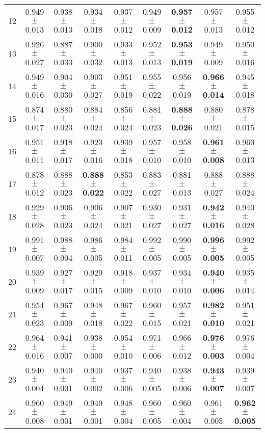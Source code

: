 \begin{table}[!ht]
{\begin{tabular}{r c c c c c c c c}
12 & 0.949 $\pm$ 0.013 & 0.938 $\pm$ 0.013 & 0.934 $\pm$ 0.018 & 0.937 $\pm$ 0.012 & 0.949 $\pm$ 0.009 & \textbf{0.957 $\pm$ 0.012} & 0.957 $\pm$ 0.013 & 0.955 $\pm$ 0.012 \\
13 & 0.926 $\pm$ 0.027 & 0.887 $\pm$ 0.033 & 0.900 $\pm$ 0.032 & 0.933 $\pm$ 0.013 & 0.952 $\pm$ 0.013 & \textbf{0.953 $\pm$ 0.019} & 0.949 $\pm$ 0.009 & 0.950 $\pm$ 0.016 \\
14 & 0.949 $\pm$ 0.016 & 0.904 $\pm$ 0.030 & 0.903 $\pm$ 0.027 & 0.951 $\pm$ 0.019 & 0.955 $\pm$ 0.022 & 0.956 $\pm$ 0.019 & \textbf{0.966 $\pm$ 0.014} & 0.945 $\pm$ 0.018 \\
15 & 0.874 $\pm$ 0.017 & 0.880 $\pm$ 0.023 & 0.884 $\pm$ 0.024 & 0.856 $\pm$ 0.024 & 0.881 $\pm$ 0.023 & \textbf{0.888 $\pm$ 0.026} & 0.880 $\pm$ 0.021 & 0.878 $\pm$ 0.015 \\
16 & 0.951 $\pm$ 0.011 & 0.918 $\pm$ 0.017 & 0.923 $\pm$ 0.016 & 0.939 $\pm$ 0.018 & 0.957 $\pm$ 0.010 & 0.958 $\pm$ 0.010 & \textbf{0.961 $\pm$ 0.008} & 0.960 $\pm$ 0.013 \\
17 & 0.878 $\pm$ 0.012 & 0.888 $\pm$ 0.023 & \textbf{0.888 $\pm$ 0.022} & 0.853 $\pm$ 0.022 & 0.883 $\pm$ 0.027 & 0.881 $\pm$ 0.013 & 0.888 $\pm$ 0.027 & 0.888 $\pm$ 0.024 \\
18 & 0.929 $\pm$ 0.028 & 0.906 $\pm$ 0.023 & 0.906 $\pm$ 0.024 & 0.907 $\pm$ 0.021 & 0.930 $\pm$ 0.027 & 0.931 $\pm$ 0.027 & \textbf{0.942 $\pm$ 0.016} & 0.940 $\pm$ 0.028 \\
19 & 0.991 $\pm$ 0.007 & 0.988 $\pm$ 0.004 & 0.986 $\pm$ 0.005 & 0.984 $\pm$ 0.011 & 0.992 $\pm$ 0.005 & 0.990 $\pm$ 0.005 & \textbf{0.996 $\pm$ 0.005} & 0.992 $\pm$ 0.005 \\
20 & 0.939 $\pm$ 0.009 & 0.927 $\pm$ 0.017 & 0.929 $\pm$ 0.015 & 0.918 $\pm$ 0.009 & 0.937 $\pm$ 0.010 & 0.934 $\pm$ 0.010 & \textbf{0.940 $\pm$ 0.006} & 0.935 $\pm$ 0.014 \\
21 & 0.954 $\pm$ 0.023 & 0.967 $\pm$ 0.009 & 0.948 $\pm$ 0.018 & 0.967 $\pm$ 0.022 & 0.960 $\pm$ 0.015 & 0.957 $\pm$ 0.021 & \textbf{0.982 $\pm$ 0.010} & 0.951 $\pm$ 0.021 \\
22 & 0.964 $\pm$ 0.016 & 0.941 $\pm$ 0.007 & 0.938 $\pm$ 0.000 & 0.954 $\pm$ 0.010 & 0.971 $\pm$ 0.006 & 0.966 $\pm$ 0.012 & \textbf{0.976 $\pm$ 0.003} & 0.976 $\pm$ 0.004 \\
23 & 0.940 $\pm$ 0.004 & 0.940 $\pm$ 0.001 & 0.940 $\pm$ 0.002 & 0.937 $\pm$ 0.006 & 0.940 $\pm$ 0.005 & 0.938 $\pm$ 0.006 & \textbf{0.943 $\pm$ 0.007} & 0.939 $\pm$ 0.007 \\
24 & 0.960 $\pm$ 0.008 & 0.949 $\pm$ 0.001 & 0.949 $\pm$ 0.001 & 0.948 $\pm$ 0.004 & 0.960 $\pm$ 0.005 & 0.960 $\pm$ 0.004 & 0.961 $\pm$ 0.005 & \textbf{0.962 $\pm$ 0.005} \\

\end{tabular}}
\end{table}
